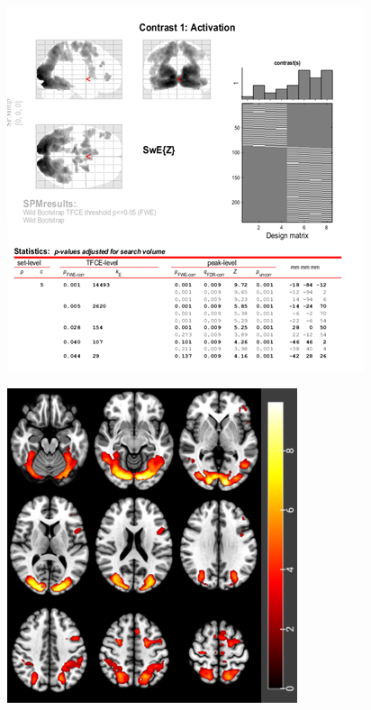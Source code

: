 \documentclass[a4paper,fleqn]{cas-sc}
\begin{document}
\begin{figure}[ht]
    \centering
    \begin{minipage}{0.48\textwidth}
        \centering
        \includegraphics[clip, trim=0 0 0 0, width=\linewidth]{figs/AgeXCon_spm.png} %
         \label{fig:a}
    \end{minipage}
    \begin{minipage}{0.48\textwidth}
        \centering
        \includegraphics[clip, trim=0 0 0 0, width=\linewidth]{figs/AgeXCon_slice.png} %

\end{minipage}
\end{figure}
\end{document}

